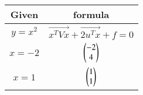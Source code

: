 \begin{tabular}[4pt]{| c| c|}
\hline 
	\textbf{Given} &  \textbf{formula}\\
\hline
	$y = x^2$ & $\vec{x^TVx}+\vec{2u^Tx}+f=0$\\
\hline
	$x = - 2$ & $\begin{pmatrix} -2 \\ 4\end{pmatrix}$\\
\hline
	$x = 1$ & $\begin{pmatrix} 1 \\ 1\end{pmatrix}$\\
\hline
\end{tabular}
